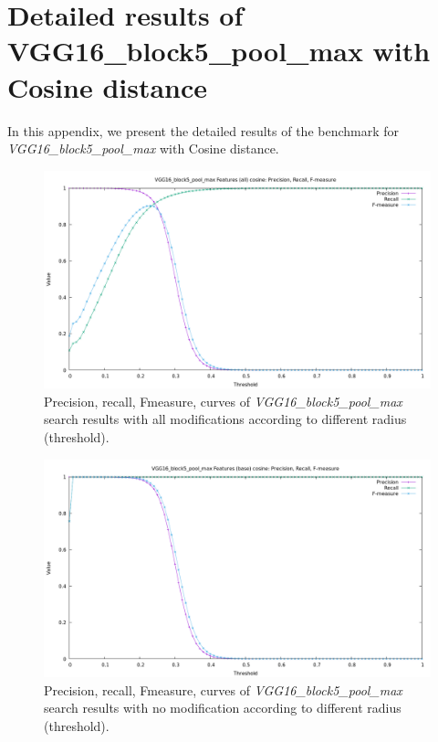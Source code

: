 \chapter{Detailed results of VGG16\_block5\_pool\_max with Cosine distance}

\label{chapter:ResultsVGG16Block5PoolMax}


In this appendix, we present the detailed results of the benchmark for \textit{VGG16\_block5\_pool\_max} with Cosine distance.

\begin{figure}
	\centering
	\includegraphics[width=\textwidth]{img/benchmark_VGG16_block5_pool_max_cosine_all.png}
	\caption{Precision, recall, Fmeasure, curves of \textit{VGG16\_block5\_pool\_max} search results with all modifications according to different radius (threshold).}
	\label{fig:benchmark_VGG16_block5_pool_max_cosine_all}
\end{figure}

\begin{figure}
	\centering
	\includegraphics[width=\textwidth]{img/benchmark_VGG16_block5_pool_max_cosine_base.png}
	\caption{Precision, recall, Fmeasure, curves of \textit{VGG16\_block5\_pool\_max} search results with no modification according to different radius (threshold).}
	\label{fig:benchmark_VGG16_block5_pool_max_cosine_base}
\end{figure}

